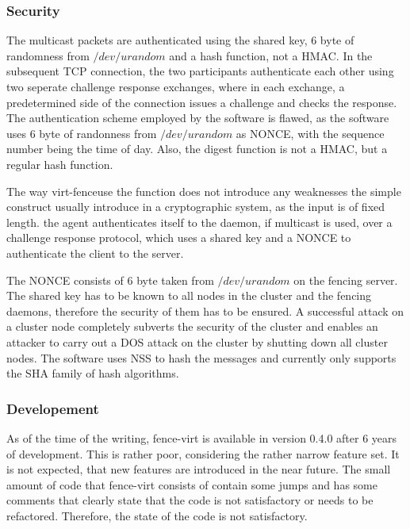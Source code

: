 \subsubsection{Security} 
The multicast packets are authenticated using the shared key, 6 byte of
randomness from $/dev/urandom$ and a hash function, not a \ac{HMAC}.
In the subsequent \ac{TCP} connection, the two participants authenticate each other using
two seperate challenge response exchanges, where in each exchange, a predetermined
side of the connection issues a challenge and checks the response.
The authentication scheme employed by the software is flawed, as
the software uses 6 byte of randonness from $/dev/urandom$ as \ac{NONCE},
with the sequence number being the time of day. Also, the digest function
is not a \ac{HMAC}, but a regular hash function.

The way virt-fenceuse the function does not introduce any weaknesses the simple construct
usually introduce in a cryptographic system, as the input is of fixed length.
the agent authenticates itself to the daemon, if multicast is used,
over a challenge response protocol, which uses a shared key and a \ac{NONCE}
to authenticate the client to the server. 

The \ac{NONCE} consists of 6 byte taken from $/dev/urandom$
on the fencing server. The shared key has to be known to
all nodes in the cluster and the fencing daemons, therefore the
security of them has to be ensured. A successful attack on a cluster node
completely subverts the security of the cluster and enables an
attacker to carry out a DOS attack on the cluster by shutting down
all cluster nodes. The software uses \ac{NSS} to hash the messages
and currently only supports the \ac{SHA} family of hash algorithms.


\subsubsection{Developement}
As of the time of the writing, fence-virt is available in version 0.4.0 after
6 years of development. This is rather poor, considering the rather narrow feature
set. It is not expected, that new features are introduced in the near future.
The small amount of code that fence-virt consists of contain some jumps
and has some comments that clearly state that the code is not satisfactory
or needs to be refactored. Therefore, the state of the code is not satisfactory.
